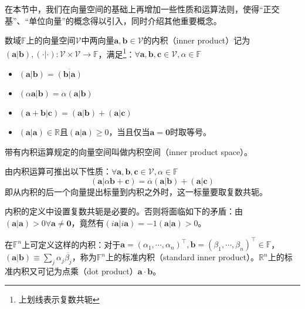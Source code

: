 \documentclass[main.tex]{subfiles}
\begin{document}
在本节中，我们在向量空间的基础上再增加一些性质和运算法则，使得“正交基”、“单位向量”的概念得以引入，同时介绍其他重要概念。

\begin{definition}[内积]
数域$\mathbb{F}$上的向量空间$\mathcal{V}$中两向量$\mathbf{a},\mathbf{b}\in\mathcal{V}$的内积（inner product）记为$\left(\mathbf{a}|\mathbf{b}\right),\left(\cdot|\cdot\right):\mathcal{V}\times\mathcal{V}\rightarrow\mathbb{F}$，满足\footnote{上划线表示复数共轭}：$\forall\mathbf{a},\mathbf{b},\mathbf{c}\in\mathcal{V},\alpha\in\mathbb{F}$
\begin{itemize}
    \item $\left(\mathbf{a}|\mathbf{b}\right)=\overline{\left(\mathbf{b}|\mathbf{a}\right)}$
    \item $\left(\alpha\mathbf{a}|\mathbf{b}\right)=\alpha\left(\mathbf{a}|\mathbf{b}\right)$
    \item $\left(\mathbf{a}+\mathbf{b}|\mathbf{c}\right)=\left(\mathbf{a}|\mathbf{b}\right)+\left(\mathbf{a}|\mathbf{c}\right)$
    \item $\left(\mathbf{a}|\mathbf{a}\right)\in\mathbb{R}$且$\left(\mathbf{a}|\mathbf{a}\right)\geq0$，当且仅当$\mathbf{a}=\mathbf{0}$时取等号。
\end{itemize}
带有内积运算规定的向量空间叫做内积空间（inner product space）。
\end{definition}

由内积运算可推出以下性质：$\forall\mathbf{a},\mathbf{b},\mathbf{c}\in\mathcal{V},\alpha\in\mathbb{F}$
\[\left(\mathbf{a}|\alpha\mathbf{b}+\mathbf{c}\right)=\overline{\alpha}\left(\mathbf{a}|\mathbf{b}\right)+\left(\mathbf{a}|\mathbf{c}\right)\]
即从内积的后一个向量提出标量到内积之外时，这一标量要取复数共轭。

内积的定义中设置复数共轭是必要的。否则将面临如下的矛盾：由$\left(\mathbf{a}|\mathbf{a}\right)>0\forall\mathbf{a}\neq\mathbf{0}$，竟然有$\left(i\mathbf{a}|i\mathbf{a}\right)=-1\left(\mathbf{a}|\mathbf{a}\right)>0$。

\begin{example}
在$\mathbb{F}^n$上可定义这样的内积：对于$\mathbf{a}=\left(\alpha_1,\cdots,\alpha_n\right)^\intercal,\mathbf{b}=\left(\beta_1,\cdots,\beta_n\right)^\intercal\in\mathbb{F}$，$\left(\mathbf{a}|\mathbf{b}\right)\equiv\sum_j\alpha_j\overline{\beta_j}$，称为$\mathbb{F}^n$上的标准内积（standard inner product）。$\mathbb{R}^n$上的标准内积又可记为点乘（dot product）$\mathbf{a}\cdot\mathbf{b}$。
\end{example}
\end{document}
